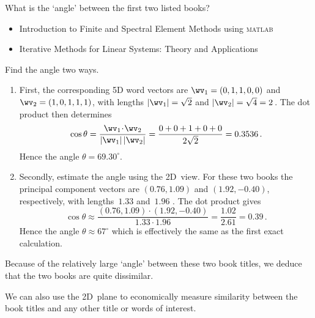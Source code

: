 \begin{example} \label{eg:}
What is the `angle' between the first two listed books?
\begin{itemize}
\item Introduction to Finite and Spectral Element Methods using \textsc{matlab}
\item Iterative Methods for Linear Systems: Theory and Applications 
\end{itemize}
\begin{solution} 
Find the angle two ways.
\begin{enumerate}
\item First, the corresponding 5D word vectors are \(\wv_1=(0,1,1,0,0)\) and \(\wv_2=(1,0,1,1,1)\), with lengths \(|\wv_1|=\sqrt2\) and \(|\wv_2|=\sqrt4=2\)\,.
The dot product then determines
\begin{equation*}
\cos\theta=\frac{\wv_1\cdot\wv_2}{|\wv_1|\,|\wv_2|}
=\frac{0+0+1+0+0}{2\sqrt2} =0.3536\,.
\end{equation*}
Hence the angle \(\theta=69.30^\circ\).
\item Secondly, estimate the angle using the 2D~view.
For these two books the principal component vectors are \((0.76,1.09)\) and \((1.92,-0.40)\), respectively, with lengths~\(1.33\) and~\(1.96\) \twodp.
The dot product gives
\begin{equation*}
\cos\theta\approx \frac{(0.76,1.09)\cdot(1.92,-0.40)}{1.33\cdot 1.96}
= \frac{1.02}{2.61}=0.39\,.
\end{equation*}
Hence the angle \(\theta\approx67^\circ\) which is effectively the same as the first exact calculation.
\end{enumerate}
Because of the relatively large `angle' between these two book titles, we deduce that the two books are quite dissimilar.
\end{solution}
\end{example}

We can also use the 2D~plane to economically measure similarity between the book titles and any other title or words of interest.

